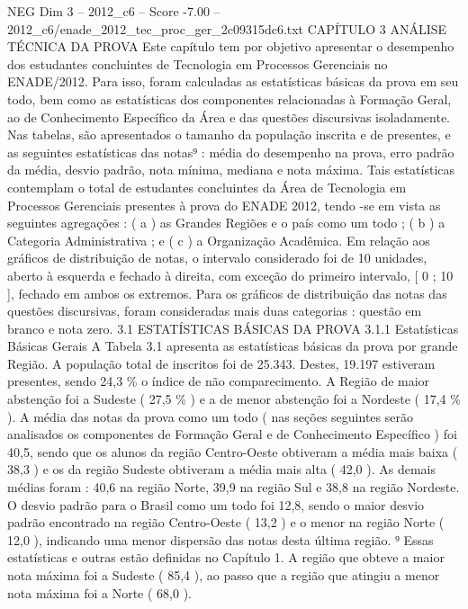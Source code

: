 \begin{textsample}{NEG Dim 3 – 2012\_c6 – Score -7.00 – 2012\_c6/enade\_2012\_tec\_proc\_ger\_2c09315dc6.txt}  \label{ex:f3_neg_023}
CAPÍTULO 3 ANÁLISE TÉCNICA DA PROVA Este capítulo tem por objetivo apresentar o desempenho dos estudantes concluintes de Tecnologia em Processos Gerenciais no ENADE/2012.
Para isso, foram calculadas as estatísticas básicas da prova em seu todo, bem como as estatísticas dos componentes relacionadas à Formação Geral, ao de Conhecimento Específico da Área e das questões discursivas isoladamente.
Nas tabelas, são apresentados o tamanho da população inscrita e de presentes, e as seguintes estatísticas das notas⁹ : média do desempenho na prova, erro padrão da média, desvio padrão, nota mínima, mediana e nota máxima.
Tais estatísticas contemplam o total de estudantes concluintes da Área de Tecnologia em Processos Gerenciais presentes à prova do ENADE 2012, tendo -se em vista as seguintes agregações : ( a ) as Grandes Regiões e o país como um todo ; ( b ) a Categoria Administrativa ; e ( c ) a Organização Acadêmica.
Em relação aos gráficos de distribuição de notas, o intervalo considerado foi de 10 unidades, aberto à esquerda e fechado à direita, com exceção do primeiro intervalo, [ 0 ; 10 ], fechado em ambos os extremos.
Para os gráficos de distribuição das notas das questões discursivas, foram consideradas mais duas categorias : questão em branco e nota zero. 3.1 ESTATÍSTICAS BÁSICAS DA PROVA 3.1.1 Estatísticas Básicas Gerais A Tabela 3.1 apresenta as estatísticas básicas da prova por grande Região.
A população total de inscritos foi de 25.343.
Destes, 19.197 estiveram presentes, sendo 24,3 \% o índice de não comparecimento.
A Região de maior abstenção foi a Sudeste ( 27,5 \% ) e a de menor abstenção foi a Nordeste ( 17,4 \% ).
A média das notas da prova como um todo ( nas seções seguintes serão analisados os componentes de Formação Geral e de Conhecimento Específico ) foi 40,5, sendo que os alunos da região Centro-Oeste obtiveram a média mais baixa ( 38,3 ) e os da região Sudeste obtiveram a média mais alta ( 42,0 ).
As demais médias foram : 40,6 na região Norte, 39,9 na região Sul e 38,8 na região Nordeste.
O desvio padrão para o Brasil como um todo foi 12,8, sendo o maior desvio padrão encontrado na região Centro-Oeste ( 13,2 ) e o menor na região Norte ( 12,0 ), indicando uma menor dispersão das notas desta última região. ⁹ Essas estatísticas e outras estão definidas no Capítulo 1.
A região que obteve a maior nota máxima foi a Sudeste ( 85,4 ), ao passo que a região que atingiu a menor nota máxima foi a Norte ( 68,0 ).

\end{textsample}
